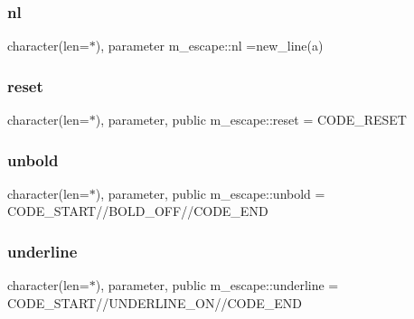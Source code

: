 \mbox{\label{namespacem__escape_aa17be0f87e5ec9012a38c04bfbb5e588}} 
\subsubsection{\texorpdfstring{nl}{nl}}
{\footnotesize\ttfamily character(len=$\ast$), parameter m\+\_\+escape\+::nl =new\+\_\+line(\textquotesingle{}a\textquotesingle{})\hspace{0.3cm}{\ttfamily [private]}}

\mbox{\label{namespacem__escape_ae02be34bb084db8024b234bc87058d3a}} 
\subsubsection{\texorpdfstring{reset}{reset}}
{\footnotesize\ttfamily character(len=$\ast$), parameter, public m\+\_\+escape\+::reset = C\+O\+D\+E\+\_\+\+R\+E\+S\+ET}

\mbox{\label{namespacem__escape_aaa2404c29a0f5840417e71a8219a118c}} 
\subsubsection{\texorpdfstring{unbold}{unbold}}
{\footnotesize\ttfamily character(len=$\ast$), parameter, public m\+\_\+escape\+::unbold = C\+O\+D\+E\+\_\+\+S\+T\+A\+RT//B\+O\+L\+D\+\_\+\+O\+FF//C\+O\+D\+E\+\_\+\+E\+ND}

\mbox{\label{namespacem__escape_acee3a3082a12ed884ef99019d0f30f86}} 
\subsubsection{\texorpdfstring{underline}{underline}}
{\footnotesize\ttfamily character(len=$\ast$), parameter, public m\+\_\+escape\+::underline = C\+O\+D\+E\+\_\+\+S\+T\+A\+RT//U\+N\+D\+E\+R\+L\+I\+N\+E\+\_\+\+ON//C\+O\+D\+E\+\_\+\+E\+ND}

